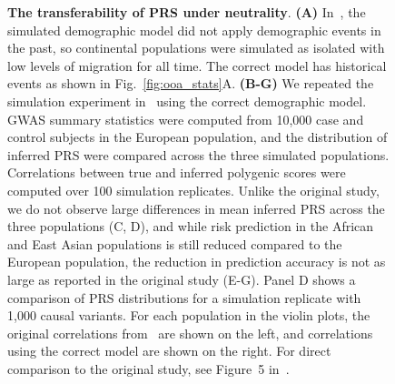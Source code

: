 \documentclass{article}
\begin{document}
\begin{figure}[ht]
\begin{center}
\caption{\textbf{The transferability of PRS under neutrality}.
    \textbf{(A)} In~\citet{martin2017human}, the simulated demographic model did not apply demographic
    events in the past, so continental populations were simulated as isolated with low levels of migration
    for all time. The correct model has historical events as shown in Fig.~\ref{fig:ooa_stats}A.
    \textbf{(B-G)} We repeated the simulation experiment in~\cite{martin2017human} using the correct
    demographic model.
    GWAS summary statistics were computed from 10,000 case and control subjects in the European
    population, and the distribution of inferred PRS were compared across the three simulated populations.
    Correlations between true and inferred polygenic scores were computed over 100 simulation replicates.
    Unlike the original study, we do not observe large differences in mean inferred PRS across
    the three populations (C, D), and while risk prediction in the African and East Asian populations is
    still reduced compared to the European population, the reduction in prediction accuracy is not as
    large as reported in the original study (E-G).
    Panel D shows a comparison of PRS distributions for a simulation replicate with 1,000 causal variants.
    For each population in the violin plots, the original correlations from~\citet{martin2017human}
    are shown on the left, and correlations using the correct model are shown on the right.
    For direct comparison to the original study, see Figure~5 in~\citet{martin2017human}.
}
\label{fig:prs}
\end{center}
\end{figure}
\end{document}
